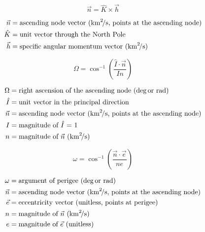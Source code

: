 \documentclass{article}
\begin{document}
\begin{multicols}{3}
	\begin{equation*}
	\boxed{\vec{n} = \hat{K} \times \vec{h}}
	\end{equation*}

	\vfill\null
	\columnbreak

	\begin{align*}
	\vec{n} &= \text{ascending node vector (\si{\kilo\meter\squared\per\second}, points at the ascending node)}\\
	\hat{K} &= \text{unit vector through the North Pole}\\
	\vec{h} &= \text{specific angular momentum vector (\si{\kilo\meter\squared\per\second})}\\
	\end{align*}
\end{multicols}

\begin{multicols}{3}
	\begin{equation*}
	\boxed{\Omega = \cos^{-1}\left(\dfrac{\hat{I} \cdot \vec{n}}{In}\right)}
	\end{equation*}

	\vfill\null
	\columnbreak

	\begin{align*}
	\Omega &= \text{right ascension of the ascending node (\si{\deg \text{or } \radian})}\\
	\hat{I} &= \text{unit vector in the principal direction}\\
	\vec{n} &= \text{ascending node vector (\si{\kilo\meter\squared\per\second}, points at the ascending node)}\\
	I &= \text{magnitude of $\hat{I}$ = 1}\\
	n &= \text{magnitude of $\vec{n}$ (\si{\kilo\meter\squared\per\second})}\\
	\end{align*}
\end{multicols}

\begin{multicols}{3}
	\begin{equation*}
	\boxed{\omega = \cos^{-1} \left(\dfrac{\vec{n}\cdot\vec{e}}{ne}\right)}
	\end{equation*}

	\vfill\null
	\columnbreak

	\begin{align*}
	\omega &= \text{argument of perigee (\si{\deg \text{or } \radian})}\\
	\vec{n} &= \text{ascending node vector (\si{\kilo\meter\squared\per\second}, points at the ascending node)}\\
	\vec{e} &= \text{eccentricity vector (unitless, points at perigee)}\\
	n &= \text{magnitude of $\vec{n}$ (\si{\kilo\meter\squared\per\second})}\\
	e &= \text{magnitude of $\vec{e}$ (unitless)}\\
	\end{align*}
\end{multicols}
\end{document}
